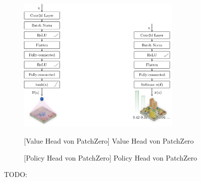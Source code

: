 \begin{figure}[!ht]
    \centering
    \includegraphics[width=0.7\textwidth]{res/pictures/value-and-policy-head.pdf}
    \\
    \begin{minipage}{.49\textwidth}
        \centering
        [Value Head von PatchZero]{\unskip}
        Value Head von PatchZero
        \label{fig:value-head}
    \end{minipage}
    \hfill
    \begin{minipage}{.49\textwidth}
        \centering
        [Policy Head von PatchZero]{\unskip}
        Policy Head von PatchZero
        \label{fig:policy-head}
    \end{minipage}
\end{figure}

TODO:
